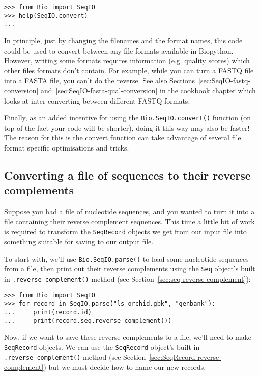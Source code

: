 \begin{verbatim}
>>> from Bio import SeqIO
>>> help(SeqIO.convert)
...
\end{verbatim}

In principle, just by changing the filenames and the format names, this code
could be used to convert between any file formats available in Biopython.
However, writing some formats requires information (e.g. quality scores) which
other files formats don't contain. For example, while you can turn a FASTQ
file into a FASTA file, you can't do the reverse. See also
Sections~\ref{sec:SeqIO-fastq-conversion} and~\ref{sec:SeqIO-fasta-qual-conversion}
in the cookbook chapter which looks at inter-converting between different FASTQ formats.

Finally, as an added incentive for using the \verb|Bio.SeqIO.convert()| function
(on top of the fact your code will be shorter), doing it this way may also be
faster! The reason for this is the convert function can take advantage of
several file format specific optimisations and tricks.

\subsection{Converting a file of sequences to their reverse complements}
\label{sec:SeqIO-reverse-complement}

Suppose you had a file of nucleotide sequences, and you wanted to turn it into a file containing their reverse complement sequences.  This time a little bit of work is required to transform the \verb|SeqRecord| objects we get from our input file into something suitable for saving to our output file.

To start with, we'll use \verb|Bio.SeqIO.parse()| to load some nucleotide
sequences from a file, then print out their reverse complements using
the \verb|Seq| object's built in \verb|.reverse_complement()| method (see Section~\ref{sec:seq-reverse-complement}):

\begin{verbatim}
>>> from Bio import SeqIO
>>> for record in SeqIO.parse("ls_orchid.gbk", "genbank"):
...     print(record.id)
...     print(record.seq.reverse_complement())
\end{verbatim}

Now, if we want to save these reverse complements to a file, we'll need to make \verb|SeqRecord| objects.
We can use  the \verb|SeqRecord| object's built in \verb|.reverse_complement()| method (see Section~\ref{sec:SeqRecord-reverse-complement}) but we must decide how to name our new records.

